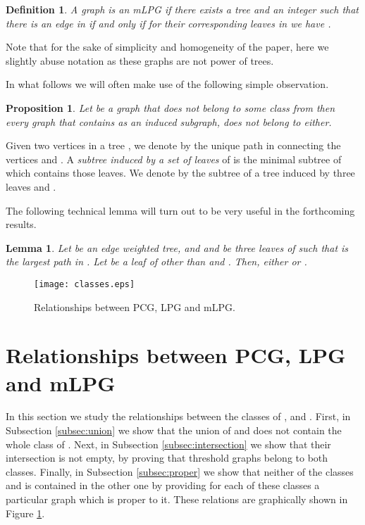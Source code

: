\documentclass[dvipdfm]{llncs}
\newtheorem{Proposition}{Proposition}
\newtheorem{Lemma}{Lemma}
\newtheorem{Definition}{Definition}
\begin{document}
\begin{Definition}
A graph  is an mLPG if there exists a tree  and an integer  such that there is an edge  in  if and only if for their corresponding leaves  in  we have . 
\end{Definition}
Note that for the sake of simplicity and homogeneity of the paper, here we slightly abuse notation as these graphs are not power of trees.


\medskip
\noindent
In what follows we will often make use of the following simple observation.

\begin{Proposition}\label{prop:technical}
Let  be a  graph that does not belong to some class  from  then every graph  that contains  as an induced subgraph, does not belong to  either.
\end{Proposition}


Given two vertices  in a tree , we denote by  the unique path in  connecting the vertices  and . A {\em subtree induced by a set of leaves} of  is the minimal subtree of  which contains those leaves. We denote by  the subtree of a tree induced by three leaves  and . 

The following technical lemma will turn out to be very useful in the forthcoming results.

\begin{Lemma}\label{lem:technical} \cite{YBR10}
Let  be an edge weighted tree, and  and  be three leaves of 
such that  is the largest path in . Let  be a leaf of  other than  and
. Then, either  or .
\end{Lemma}


\begin{figure}[h]
	\centering
	\texttt{[image: classes.eps]}
\caption{Relationships between PCG, LPG and mLPG.}
\label{fig:classes}
\end{figure}



\section{Relationships between PCG, LPG and mLPG  }\label{sec:relations}

In this section we study the relationships between the classes of ,  and . First, in Subsection \ref{subsec:union} we show that the union of  and  does not contain the whole class of . Next, in Subsection \ref{subsec:intersection} we show that their intersection  is not empty, by proving that threshold graphs belong to both classes. Finally, in Subsection \ref{subsec:proper} we show that neither of the classes  and  is contained in the other one by providing for each of these classes a particular graph which is proper to it. These relations are graphically shown in Figure \ref{fig:classes}. 
\end{document}
